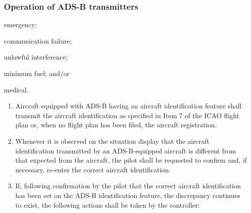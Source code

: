 \subsubsection{Operation of ADS-B transmitters}
\begin{enumempty}[labelindent=\parindent]
    \begin{noteev}
        \item {}
        \begin{enumalph}
            \item emergency;
            \item communication failure;
            \item unlawful interference;
            \item minimum fuel; and/or
            \item medical.
        \end{enumalph}
        \item {}
    \end{noteev}
\end{enumempty}


\begin{enumerate}
    \item Aircraft equipped with ADS-B having an aircraft identification feature shall transmit the aircraft identification as specified in Item 7 of the ICAO flight plan or, when no flight plan has been filed, the aircraft registration.
    \item Whenever it is observed on the situation display that the aircraft identification transmitted by an ADS-B-equipped aircraft is different from that expected from the aircraft, the pilot shall be requested to confirm and, if necessary, re-enter the correct aircraft identification.
    \item If, following confirmation by the pilot that the correct aircraft identification has been set on the ADS-B identification feature, the discrepancy continues to exist, the following actions shall be taken by the controller:

\end{enumerate}

